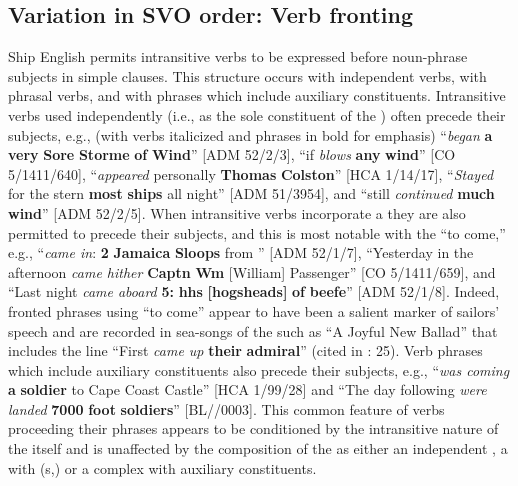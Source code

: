 \subsection{{Variation in SVO order: Verb fronting}}%

Ship English permits intransitive verbs to be expressed before noun-phrase subjects in simple clauses. This structure occurs with independent verbs, with phrasal verbs, and with  phrases which include auxiliary constituents. Intransitive verbs used independently (i.e., as the sole constituent of the ) often precede their  subjects, e.g., (with verbs italicized and  phrases in bold for emphasis) “\textit{began} \textbf{a} \textbf{very} \textbf{Sore} \textbf{Storme} \textbf{of} \textbf{Wind}” [ADM 52/2/3], “if \textit{blows} \textbf{any} \textbf{wind}” [CO 5/1411/640], “\textit{appeared} personally \textbf{Thomas} \textbf{Colston}” [HCA 1/14/17], “\textit{Stayed} for the stern \textbf{most} \textbf{ships} all night” [ADM 51/3954], and “still \textit{continued} \textbf{much} \textbf{wind}” [ADM 52/2/5]. When intransitive verbs incorporate a  they are also permitted to precede their  subjects, and this is most notable with the  “to come,” e.g., “\textit{came in}: \textbf{2} \textbf{Jamaica} \textbf{Sloops} from ” [ADM 52/1/7], “Yesterday in the afternoon \textit{came hither} \textbf{Captn} \textbf{Wm} [William] Passenger” [CO 5/1411/659], and “Last night \textit{came aboard} \textbf{5:} \textbf{hhs} \textbf{[hogsheads]} \textbf{of} \textbf{beefe}” [ADM 52/1/8]. Indeed, fronted  phrases using “to come” appear to have been a salient marker of sailors’ speech and are recorded in sea-songs of the  such as “A Joyful New Ballad” that includes the line “First \textit{came up} \textbf{their} \textbf{admiral}” (cited in \citealt{Palmer1986}: 25). Verb phrases which include auxiliary constituents also precede their  subjects, e.g., “\textit{was coming} \textbf{a} \textbf{soldier} to Cape Coast Castle” [HCA 1/99/28] and “The day following \textit{were landed} \textbf{7000} \textbf{foot} \textbf{soldiers}” [BL/\citealt{Egerton2395}/0003]. This common feature of verbs proceeding their  phrases appears to be conditioned by the intransitive nature of the  itself and is unaffected by the composition of the  as either an independent , a  with (s,) or a complex  with auxiliary constituents. 

